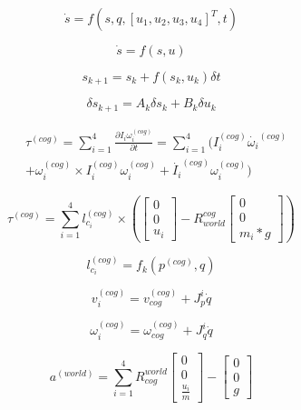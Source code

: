 \documentclass{jarticle}
\begin{document}
\begin{equation}
  \dot{s} = f(s, q, [u_1, u_2, u_3, u_4]^T, t)
\end{equation}

\begin{equation}
  \dot{s} = f(s, u)
\end{equation}

\begin{equation}
  s_{k+1} = s_k + f(s_k, u_k) {\delta t}
\end{equation}

\begin{equation}
  \delta s_{k+1} = A_k \delta s_k + B_k \delta u_k
\end{equation}


\begin{eqnarray}
  &\tau^{(cog)} = \sum_{i=1}^{4} \frac{\partial I_i \omega_i^{(cog)}}{\partial t} =
  \sum_{i=1}^{4}(I_i^{(cog)} \dot{\omega_i}^{(cog)} \\  \nonumber
  & + \omega_i^{(cog)} \times I_i^{(cog)} \omega_i^{(cog)}
  + \dot{I_i}^{(cog)} \omega_i^{(cog)})
\end{eqnarray}

\begin{equation}
  \tau^{(cog)} =
  \sum_{i=1}^{4}
  {l_{c_i}^{(cog)}
    \times  (\left[ \begin{array}{c}
        0 \\
        0 \\
        u_i
      \end{array}\right]
    - R_{world}^{cog}  \left[ \begin{array}{c}
        0 \\
        0 \\
        m_i*g
      \end{array}\right] )}
\end{equation}

\begin{equation}
  l_{c_i}^{(cog)} = f_k (p^{(cog)}, {q})
\end{equation}

\begin{equation}
  v_i^{(cog)} = v_{cog}^{(cog)} + J_p^i \dot{q}
\end{equation}

\begin{equation}
  \omega_i^{(cog)} = \omega_{cog}^{(cog)} + J_q^i \dot{q}
\end{equation}

\begin{equation}
  a^{(world)} =
  \sum_{i=1}^{4}
  {R_{cog}^{world}
    \left[ \begin{array}{c}
        0 \\
        0 \\
        \frac{u_i}{m}
      \end{array}\right]}
    -  \left[ \begin{array}{c}
        0 \\
        0 \\
        g
      \end{array}\right]
\end{equation}
\end{document}
